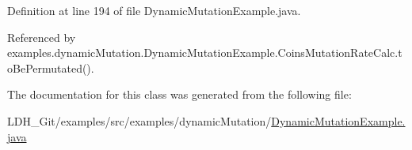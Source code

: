 Definition at line 194 of file Dynamic\-Mutation\-Example.\-java.



Referenced by examples.\-dynamic\-Mutation.\-Dynamic\-Mutation\-Example.\-Coins\-Mutation\-Rate\-Calc.\-to\-Be\-Permutated().



The documentation for this class was generated from the following file\-:\begin{DoxyCompactItemize}
\item 
L\-D\-H\-\_\-\-Git/examples/src/examples/dynamic\-Mutation/\hyperlink{_dynamic_mutation_example_8java}{Dynamic\-Mutation\-Example.\-java}\end{DoxyCompactItemize}
